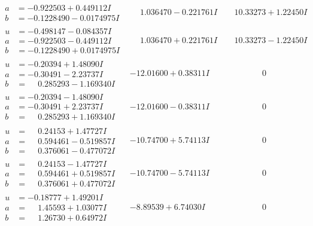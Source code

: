 \documentclass[1p]{elsarticle_modified}
\theoremstyle{definition}
\begin{document}
$$\begin{array}{c|c|c}
\begin{aligned}
a &= -0.922503 + 0.449112 I \\
b &= -0.1228490 - 0.0174975 I\end{aligned}
 & \phantom{-}1.036470 - 0.221761 I & \phantom{-}10.33273 + 1.22450 I \\ \hline\begin{aligned}
u &= -0.498147 - 0.084357 I \\
a &= -0.922503 - 0.449112 I \\
b &= -0.1228490 + 0.0174975 I\end{aligned}
 & \phantom{-}1.036470 + 0.221761 I & \phantom{-}10.33273 - 1.22450 I \\ \hline\begin{aligned}
u &= -0.20394 + 1.48090 I \\
a &= -0.30491 - 2.23737 I \\
b &= \phantom{-}0.285293 - 1.169340 I\end{aligned}
 & -12.01600 + 0.38311 I & \phantom{-0.000000 } 0 \\ \hline\begin{aligned}
u &= -0.20394 - 1.48090 I \\
a &= -0.30491 + 2.23737 I \\
b &= \phantom{-}0.285293 + 1.169340 I\end{aligned}
 & -12.01600 - 0.38311 I & \phantom{-0.000000 } 0 \\ \hline\begin{aligned}
u &= \phantom{-}0.24153 + 1.47727 I \\
a &= \phantom{-}0.594461 - 0.519857 I \\
b &= \phantom{-}0.376061 - 0.477072 I\end{aligned}
 & -10.74700 + 5.74113 I & \phantom{-0.000000 } 0 \\ \hline\begin{aligned}
u &= \phantom{-}0.24153 - 1.47727 I \\
a &= \phantom{-}0.594461 + 0.519857 I \\
b &= \phantom{-}0.376061 + 0.477072 I\end{aligned}
 & -10.74700 - 5.74113 I & \phantom{-0.000000 } 0 \\ \hline\begin{aligned}
u &= -0.18777 + 1.49201 I \\
a &= \phantom{-}1.45593 + 1.03077 I \\
b &= \phantom{-}1.26730 + 0.64972 I\end{aligned}
 & -8.89539 + 6.74030 I & \phantom{-0.000000 } 0 \\ \hline\begin{aligned}

\end{aligned}
\end{array}$$
\end{document}

